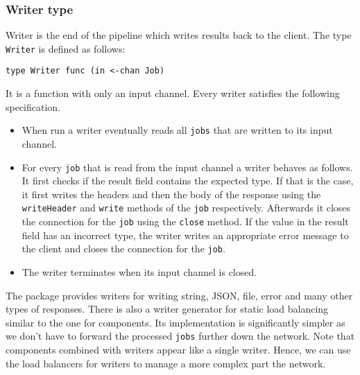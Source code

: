 \subsubsection{Writer type}
Writer is the end of the pipeline which writes results back to the client.
The type \texttt{Writer} is defined as follows:
\begin{lstlisting}
type Writer func (in <-chan Job)
\end{lstlisting}
It is a function with only an input channel.
Every writer satisfies the following specification.
\begin{itemize}
    \item When run a writer eventually reads all \texttt{jobs} that are written 
          to its input channel.

	\item For every \texttt{job} that is  read from the input channel a writer 
          behaves as follows. It first checks if the result field 
          contains the expected type. If that is the case, it first 
          writes the headers and then the body of the response using 
          the \texttt{writeHeader} and \texttt{write} methods of the \texttt{job} respectively. Afterwards it closes the connection for the \texttt{job} 
          using the \texttt{close} method. If the value in the result 
          field has an incorrect type, the writer writes an appropriate 
          error message to the client and closes the connection for the 
          \texttt{job}. 

	\item The writer terminates when its input channel is closed.
\end{itemize}
The package provides writers for writing string, JSON, file, error and many
other types of responses. There is also a writer generator for static
load balancing similar to the one for components. Its implementation
is significantly simpler as we don't have to forward the processed
\texttt{jobs} further down the network. Note that components
combined with writers appear like a single writer. Hence, we can use the
load balancers for writers to manage a more complex part the network.

